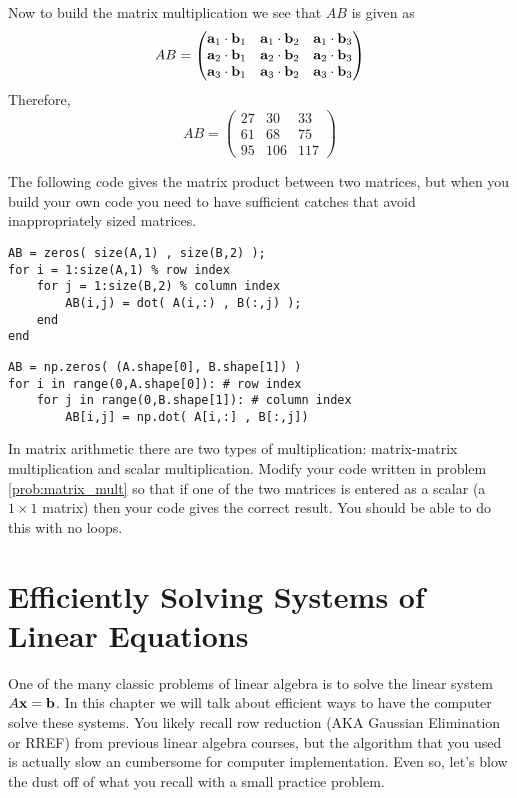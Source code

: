 \begin{example}
    Now to build the matrix multiplication we see that $AB$ is given as
    \[ AB = \begin{pmatrix} 
            {\bf a}_1 \cdot {\bf b}_1 & {\bf a}_1 \cdot {\bf b}_2 & {\bf a}_1 \cdot {\bf b}_3 \\
            {\bf a}_2 \cdot {\bf b}_1 & {\bf a}_2 \cdot {\bf b}_2 & {\bf a}_2 \cdot {\bf b}_3 \\
            {\bf a}_3 \cdot {\bf b}_1 & {\bf a}_3 \cdot {\bf b}_2 & {\bf a}_3 \cdot {\bf b}_3
    \end{pmatrix} \]
    Therefore,
    \[ AB = \begin{pmatrix} 27 & 30 & 33 \\
            61 & 68 & 75 \\
        95 & 106 & 117 \end{pmatrix} \]
\end{example}

The following \ProgLang code gives the matrix product between two matrices, but when you
build your own code you need to have sufficient catches that avoid inappropriately sized
matrices.
\ifnum{}
\begin{lstlisting}
AB = zeros( size(A,1) , size(B,2) );
for i = 1:size(A,1) % row index
    for j = 1:size(B,2) % column index
        AB(i,j) = dot( A(i,:) , B(:,j) );
    end
end
\end{lstlisting}
\else
\begin{lstlisting}
AB = np.zeros( (A.shape[0], B.shape[1]) )
for i in range(0,A.shape[0]): # row index
    for j in range(0,B.shape[1]): # column index
        AB[i,j] = np.dot( A[i,:] , B[:,j])
\end{lstlisting}
\fi

\begin{problem}
    In matrix arithmetic there are two types of multiplication: matrix-matrix
    multiplication and scalar multiplication.  Modify your code written in problem
    \ref{prob:matrix_mult} so that if one of the two matrices is entered as a scalar (a $1
    \times 1$ matrix) then your  code gives the correct result. You
    should be able to do this with no loops.
\end{problem}


\newpage\section{Efficiently Solving Systems of Linear Equations}
One of the many classic problems of linear algebra is to solve the linear system $A {\bf x} =
{\bf b}$. In this chapter we will talk about efficient ways to have the computer solve
these systems. You likely recall row reduction (AKA Gaussian Elimination or RREF) from previous linear algebra
courses, but the algorithm that you used is actually slow an cumbersome for computer
implementation.  Even so, let's blow the dust off of what you recall with a small practice
problem.


